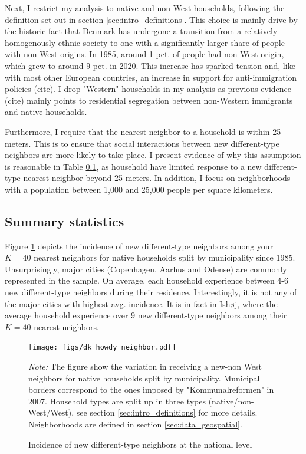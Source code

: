 \documentclass[main.tex]{subfiles}
\begin{document}
Next, I restrict my analysis to native and non-West households, following the definition set out in section \ref{sec:intro_definitions}. This choice is mainly drive by the historic fact that Denmark has undergone a transition from a relatively homogenously ethnic society to one with a significantly larger share of people with non-West origins. In 1985, around 1 pct. of people had non-West origin, which grew to around 9 pct. in 2020. This increase has sparked tension and, like with most other European countries, an increase in support for anti-immigration policies (cite). I drop "Western" households in my analysis as previous evidence (cite) mainly points to residential segregation between non-Western immigrants and native households.

Furthermore, I require that the nearest neighbor to a household is within 25 meters. This is to ensure that social interactions between new different-type neighbors are more likely to take place. I present evidence of why this assumption is reasonable in Table \ref{}, as household have limited response to a new different-type nearest neighbor beyond 25 meters. In addition, I focus on neighborhoods with a population between 1,000 and 25,000 people per square kilometers. 

\subsection{Summary statistics}
Figure \ref{fig:incidence_different_type_dk} depicts the incidence of new different-type neighbors among your $K=40$ nearest neighbors for native households split by municipality since 1985. Unsurprisingly, major cities (Copenhagen, Aarhus and Odense) are commonly represented in the sample. On average, each household experience between 4-6 new different-type neighbors during their residence. Interestingly, it is not any of the major cities with highest avg. incidence. It is in fact in Ishøj, where the average household experience over 9 new different-type neighbors among their $K=40$ nearest neighbors. 

\begin{figure}[H]
    \centering
    \caption{Incidence of new different-type neighbors at the national level}
    \texttt{[image: figs/dk\_howdy\_neighbor.pdf]}
    \label{fig:incidence_different_type_dk}
\begin{tablenotes}
\item \footnotesize \textit{Note:} The figure show the variation in receiving a new-non West neighbors for native households split by municipality. Municipal borders correspond to the ones imposed by "Kommunalreformen" in 2007.  Household types are split up in three types (native/non-West/West), see section \ref{sec:intro_definitions} for more details. Neighborhoods are defined in section \ref{sec:data_geospatial}.
\end{tablenotes}
\end{figure}
\end{document}
